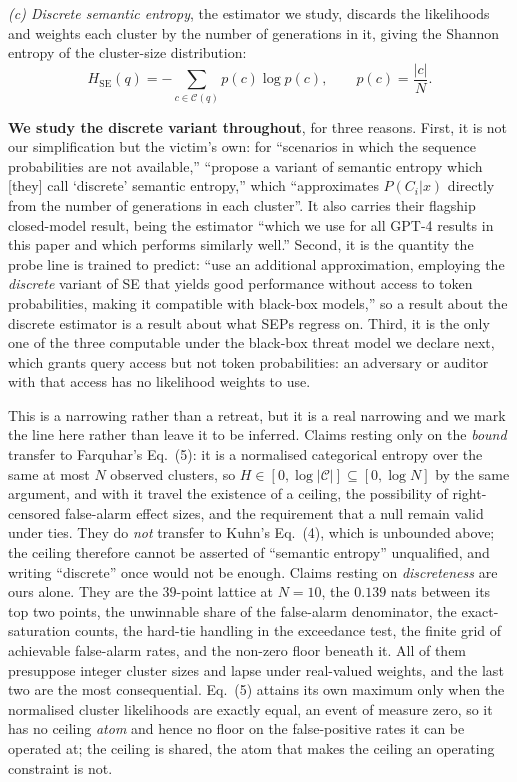 \emph{(c) Discrete semantic entropy}, the estimator we study, discards the likelihoods and
weights each cluster by the number of generations in it, giving the Shannon entropy of the
cluster-size distribution:
\[
H_{\mathrm{SE}}(q) = -\sum_{c \in \mathcal{C}(q)} p(c)\log p(c),
\qquad p(c) = \frac{|c|}{N}.
\]

\textbf{We study the discrete variant throughout}, for three reasons. First, it is not our
simplification but the victim's own: for ``scenarios in which the sequence probabilities are
not available,'' \citet{farquhar2024detecting} ``propose a variant of semantic entropy which
[they] call `discrete' semantic entropy,'' which ``approximates $P(C_i|x)$ directly from the
number of generations in each cluster''. It also carries their flagship closed-model result,
being the estimator ``which we use for all GPT-4 results in this paper and which performs
similarly well.'' Second, it is the quantity the probe line is trained to predict:
\citet{kossen2024seps} ``use an additional approximation, employing the \emph{discrete}
variant of SE that yields good performance without access to token probabilities, making it
compatible with black-box models,'' so a result about the discrete estimator is a result about
what SEPs regress on. Third, it is the only one of the three computable under the black-box
threat model we declare next, which grants query access but not token probabilities: an
adversary or auditor with that access has no likelihood weights to use.

This is a narrowing rather than a retreat, but it is a real narrowing and we mark the line
here rather than leave it to be inferred. Claims resting only on the \emph{bound} transfer to
Farquhar's Eq.~(5): it is a normalised categorical entropy over the same at most $N$ observed
clusters, so $H \in [0, \log|\mathcal{C}|] \subseteq [0, \log N]$ by the same argument, and
with it travel the existence of a ceiling, the possibility of right-censored false-alarm
effect sizes, and the requirement that a null remain valid under ties. They do \emph{not}
transfer to Kuhn's Eq.~(4), which is unbounded above; the ceiling therefore cannot be asserted
of ``semantic entropy'' unqualified, and writing ``discrete'' once would not be enough.
Claims resting on \emph{discreteness} are ours alone. They are the $39$-point lattice at
$N{=}10$, the $0.139$ nats between its top two points, the unwinnable share of the
false-alarm denominator, the exact-saturation counts, the hard-tie handling in the
exceedance test, the finite grid of achievable false-alarm rates, and the non-zero floor
beneath it. All of them presuppose integer cluster sizes and lapse under real-valued
weights, and the last two are the most consequential. Eq.~(5) attains its own maximum only
when the normalised cluster likelihoods are exactly equal, an event of measure zero, so it
has no ceiling \emph{atom} and hence no floor on the false-positive rates it can be operated
at; the ceiling is shared, the atom that makes the ceiling an operating constraint is not.

